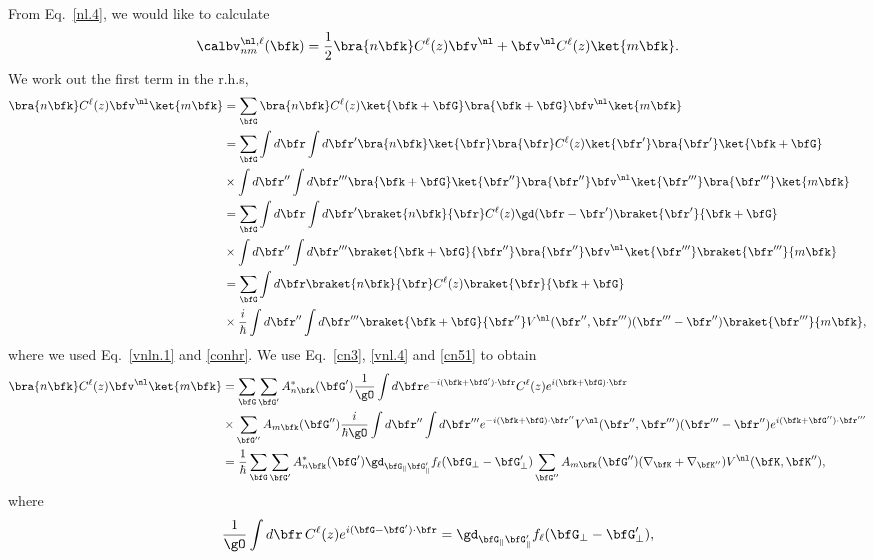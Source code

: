 From Eq.~\eqref{nl.4}, we would like to calculate
\begin{align}\label{vnl.5}
\calbv^{\nl,\ell}_{nm}(\bfk)=\frac{1}{2}
\bra{n\bfk} 
C^\ell(z)\bfv^\nl+\bfv^\nl C^\ell(z)  
\ket{m\bfk}
.
\end{align}  
We work out the first term in the r.h.s,
\begin{align}\label{vnl.6}
\bra{n\bfk}C^\ell(z) 
\bfv^\nl\ket{m\bfk}
&=\sum_{\bfG}
\bra{n\bfk}C^\ell(z)\ket{\bfk+\bfG}
\bra{\bfk+\bfG}\bfv^\nl\ket{m\bfk}
\nonumber\\
&=\sum_{\bfG}
\int d\bfr 
\int d\bfr' 
\bra{n\bfk}
\ket{\bfr}\bra{\bfr}  
C^\ell(z) 
\ket{\bfr'}\bra{\bfr'}
\ket{\bfk+\bfG}
\nonumber\\
&\times 
\int d\bfr'' 
\int d\bfr''' 
\bra{\bfk+\bfG}
\ket{\bfr''}\bra{\bfr''} 
\bfv^\nl 
\ket{\bfr'''}\bra{\bfr'''} 
\ket{m\bfk}
\nonumber\\
&=\sum_{\bfG}
\int d\bfr 
\int d\bfr' 
\braket{n\bfk}{\bfr}
C^\ell(z) 
\gd(\bfr-\bfr') 
\braket{\bfr'}{\bfk+\bfG}
\nonumber\\
&\times 
\int d\bfr'' 
\int d\bfr''' 
\braket{\bfk+\bfG}{\bfr''}
\bra{\bfr''} 
\bfv^\nl 
\ket{\bfr'''}
\braket{\bfr'''}{m\bfk}
\nonumber\\
&=\sum_{\bfG}
\int d\bfr 
\braket{n\bfk}{\bfr}
C^\ell(z) 
\braket{\bfr}{\bfk+\bfG}
\nonumber\\
&\times 
\frac{i}{\hbar}
\int d\bfr'' 
\int d\bfr''' 
\braket{\bfk+\bfG}{\bfr''}
V^\nl(\bfr'',\bfr''')(\bfr'''-\bfr'') 
\braket{\bfr'''}{m\bfk}
,
\end{align}
where we used Eq.~\eqref{vnln.1} and \eqref{conhr}. 
We use Eq.~\eqref{cn3}, \eqref{vnl.4} and \eqref{cn51}  to obtain
\begin{align}\label{vnl.7}
\bra{n\bfk}C^\ell(z) 
\bfv^\nl\ket{m\bfk}
&=\sum_{\bfG}
\sum_{\bfG'}
A^*_{n\bfk}(\bfG') 
\frac{1}{\gO}
\int d\bfr 
e^{-i(\bfk+\bfG')\cdot\bfr}
C^\ell(z) 
e^{i(\bfk+\bfG)\cdot\bfr}
\nonumber\\
&\times 
\sum_{\bfG''}
A_{m\bfk}(\bfG'') 
\frac{i}{\hbar\gO}
\int d\bfr'' 
\int d\bfr''' 
e^{-i(\bfk+\bfG)\cdot\bfr''} 
V^\nl(\bfr'',\bfr''')(\bfr'''-\bfr'') 
e^{i(\bfk+\bfG'')\cdot\bfr'''}
\nonumber\\
&=
\frac{1}{\hbar}
\sum_{\bfG}
\sum_{\bfG'}
A^*_{n\bfk}(\bfG') 
\gd_{\bfG_\parallel \bfG'_\parallel}f_\ell(\bfG_\perp-\bfG'_\perp) 
\sum_{\bfG''}
A_{m\bfk}(\bfG'') 
(\nabla_{\bfK}+\nabla_{\bfK''}) 
V^\nl(\bfK,\bfK'') 
,
\end{align}
where
\begin{align}\label{vnl.8}
\frac{1}{\gO}
\int d\bfr\, 
C^\ell(z) 
e^{i(\bfG-\bfG')\cdot\bfr}
=\gd_{\bfG_\parallel \bfG'_\parallel}f_\ell(\bfG_\perp-\bfG'_\perp)
,
\end{align} 
